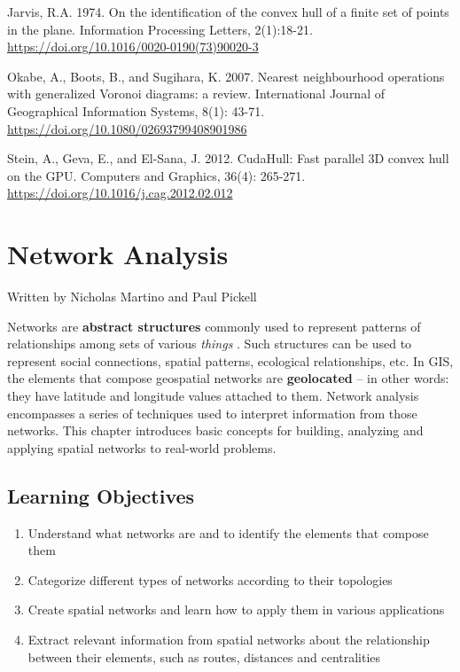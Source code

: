 \documentclass[
]{book}
\providecommand{\tightlist}{%
  \setlength{\itemsep}{0pt}\setlength{\parskip}{0pt}}
\begin{document}
Jarvis, R.A. 1974. On the identification of the convex hull of a finite set of points in the plane. Information Processing Letters, 2(1):18-21. \url{https://doi.org/10.1016/0020-0190(73)90020-3}

Okabe, A., Boots, B., and Sugihara, K. 2007. Nearest neighbourhood operations with generalized Voronoi diagrams: a review. International Journal of Geographical Information Systems, 8(1): 43-71. \url{https://doi.org/10.1080/02693799408901986}

Stein, A., Geva, E., and El-Sana, J. 2012. CudaHull: Fast parallel 3D convex hull on the GPU. Computers and Graphics, 36(4): 265-271. \url{https://doi.org/10.1016/j.cag.2012.02.012}

\chapter{Network Analysis}\label{network-analysis}

Written by
Nicholas Martino and Paul Pickell

Networks are \textbf{abstract structures} commonly used to represent patterns of relationships among sets of various \emph{things} \citep{ajorlou_introduction_2018}. Such structures can be used to represent social connections, spatial patterns, ecological relationships, etc. In GIS, the elements that compose geospatial networks are \textbf{geolocated} -- in other words: they have latitude and longitude values attached to them. Network analysis encompasses a series of techniques used to interpret information from those networks. This chapter introduces basic concepts for building, analyzing and applying spatial networks to real-world problems.

\section*{Learning Objectives}\label{learning-objectives-6}

\begin{enumerate}
\def\labelenumi{\arabic{enumi}.}
\tightlist
\item
  Understand what networks are and to identify the elements that compose them
\item
  Categorize different types of networks according to their topologies
\item
  Create spatial networks and learn how to apply them in various applications
\item
  Extract relevant information from spatial networks about the relationship between their elements, such as routes, distances and centralities
\end{enumerate}
\end{document}
